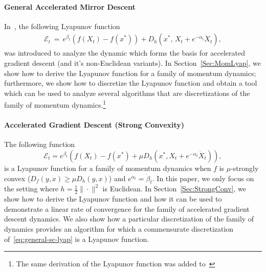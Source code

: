 \documentclass[11pt]{article}
\theoremstyle{plain}
\newcommand{\E}{{\mathcal E}}
\begin{document}
\paragraph{General Accelerated Mirror Descent} In~\cite{Acceleration}, the following Lyapunov function 
\begin{align}\label{Eq:E}
\E_t \,=\, e^{\beta_t} (f(X_t)-f(x^*)) + D_h\left(x^*, \, X_t + e^{-\alpha_t} \dot X_t\right),
\end{align}
 was introduced to analyze the dynamic which forms the basis for accelerated gradient descent (and it's non-Euclidean variants).
In Section~\ref{Sec:MomLyap}, 
  we show how to derive the Lyapunov function for a family of momentum dynamics; furthermore, we show how to discretize the Lyapunov function and obtain a tool which can be used to analyze several algorithms that are discretizations of the family of momentum dynamics.\footnote{The same derivation of the Lyapunov function was added to~\cite[App. C]{Acceleration}}
%
%
%
\paragraph{Accelerated Gradient Descent (Strong Convexity)}
 The following function 
   \begin{equation}\label{eq:general-sc-lyap}
  \E_t =  e^{\beta_t} \left(f(X_t) - f(x^\ast) + \mu D_h(x^\ast ,X_t + e^{-\alpha_t} \dot X_t)\right),
 \end{equation}
 is a Lyapunov function for a family of momentum dynamics when $f$ is $\mu$-strongly convex ($D_f(y,x) \geq \mu D_h(y,x)$) and $e^{\alpha_t} = \dot \beta_t$. 
In this paper, we only focus on the setting where $h = \frac{1}{2}\|\cdot\|^2$ is Euclidean. In Section~\ref{Sec:StrongConv}, we show how to derive the Lyapunov function and how it can be used to demonstrate a linear rate of convergence for the family of accelerated gradient descent dynamics.  We also show how a particular discretization of the family of dynamics provides an algorithm for which a commensurate discretization of~\eqref{eq:general-sc-lyap} is a Lyapunov function.
\end{document}
